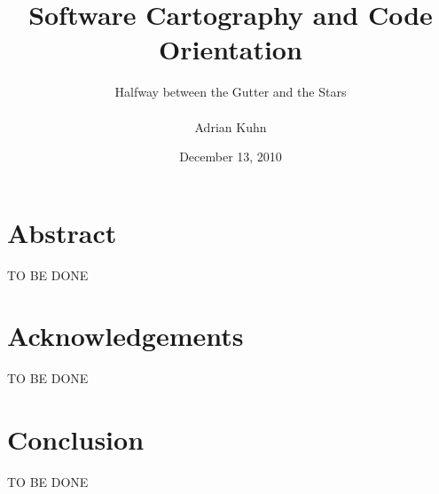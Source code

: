 \documentclass[10pt]{book}
\title{Software Cartography and Code Orientation}
\author{Halfway between the Gutter and the Stars\\~\\Adrian Kuhn}
\date{December 13, 2010}
\begin{document}
\maketitle

\chapter*{Abstract}
TO BE DONE

\chapter*{Acknowledgements}
TO BE DONE

\setcounter{tocdepth}{1}
\tableofcontents


\chapter{Conclusion}
\label{the conclusion}
TO BE DONE



\end{document}

